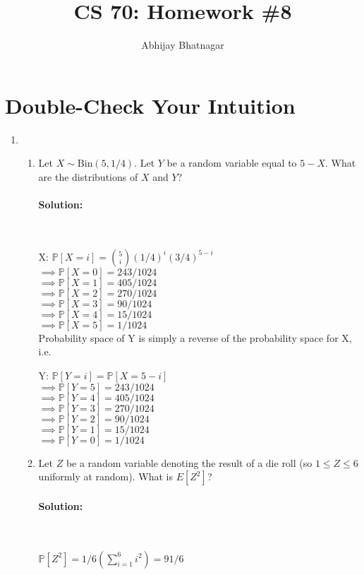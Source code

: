 \documentclass[11pt, notitlepage]{article}
\makeatletter
\newcommand{\mP}{\mathbb{P}}
\newcommand{\Question}[1]{\newpage\section{#1}}
\newenvironment{solution}{\paragraph{Solution:}}{\hfill \vspace{10mm}}
\newcommand*{\toccontents}{\@starttoc{toc}}
\makeatother
\begin{document}
   \title{CS 70: Homework \#8}
   \author{Abhijay Bhatnagar}
   \maketitle
   \toccontents

\Question{Double-Check Your Intuition}

\begin{enumerate}[label=\alph*.)]
	\item
	\begin{enumerate}[label=(\roman*)]
		\item Let $X \sim \text{Bin} (5, 1 / 4)$. Let $Y$ be a random variable equal to $5 - X$. What are the distributions of $X$ and $Y$? 
		\begin{solution} \
		
			X: $\mP[X=i] = \binom{5}{i}(1/4)^i(3/4)^{5-i}$ \\
			$\implies \mP[X=0]= 243/1024$ \\
			$\implies \mP[X=1]= 405/1024$ \\
			$\implies \mP[X=2]= 270/1024$ \\
			$\implies \mP[X=3]= 90/1024$ \\
			$\implies \mP[X=4]= 15/1024$ \\
			$\implies \mP[X=5]= 1/1024$ \\

			Probability space of Y is simply a reverse of the probability space for X, i.e. 
			
			Y: $\mP[Y=i] = \mP[X=5-i]$ \\
			$\implies \mP[Y=5]= 243/1024$ \\
			$\implies \mP[Y=4]= 405/1024$ \\
			$\implies \mP[Y=3]= 270/1024$ \\
			$\implies \mP[Y=2]= 90/1024$ \\
			$\implies \mP[Y=1]= 15/1024$ \\
			$\implies \mP[Y=0]= 1/1024$ \\
		\end{solution}
		\item Let $Z$ be a random variable denoting the result of a die roll (so $1 \leq Z \leq 6$ uniformly at random). What is $E[Z^2]$?
		\begin{solution}\
		
			$\mP[Z^2]=1/6(\sum_{i=1}^{6}i^2)=91/6$ 
		\end{solution}
	\end{enumerate}
	

\end{enumerate}
\end{document}

